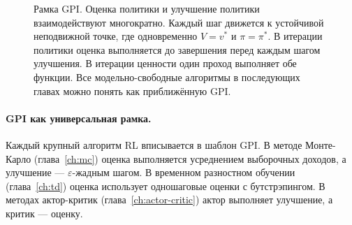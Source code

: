 \begin{figure}[ht]
\centering
{}
\caption{Рамка GPI.  Оценка политики и улучшение политики взаимодействуют многократно.  Каждый шаг движется к устойчивой неподвижной точке, где одновременно $V = v^*$ и $\pi = \pi^*$.  В итерации политики оценка выполняется до завершения перед каждым шагом улучшения.  В итерации ценности один проход выполняет обе функции.  Все модельно-свободные алгоритмы в последующих главах можно понять как приближённую GPI.}
\label{fig:gpi}
\end{figure}

\paragraph{GPI как универсальная рамка.}
Каждый крупный алгоритм RL вписывается в шаблон GPI.  В методе Монте-Карло (глава~\ref{ch:mc}) оценка выполняется усреднением выборочных доходов, а улучшение — $\varepsilon$-жадным шагом.  В временном разностном обучении (глава~\ref{ch:td}) оценка использует одношаговые оценки с бутстрэпингом.  В методах актор-критик (глава~\ref{ch:actor-critic}) актор выполняет улучшение, а критик — оценку.

